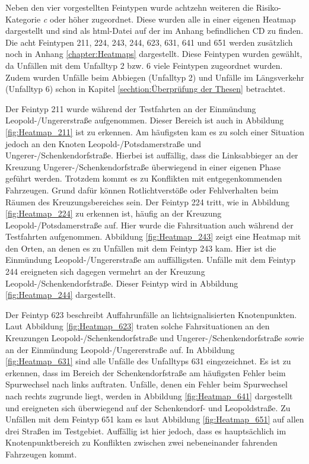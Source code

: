 Neben den vier vorgestellten Feintypen wurde achtzehn weiteren die Risiko-Kategorie \textit{c} oder höher zugeordnet. Diese wurden alle in einer eigenen Heatmap dargestellt und sind als html-Datei auf der im Anhang befindlichen CD zu finden. Die acht Feintypen 211, 224, 243, 244, 623, 631, 641 und 651 werden zusätzlich noch in Anhang \ref{chapter:Heatmaps} dargestellt. Diese Feintypen wurden gewählt, da Unfällen mit dem Unfalltyp 2 bzw. 6 viele Feintypen zugeordnet wurden. Zudem wurden Unfälle beim Abbiegen (Unfalltyp 2) und Unfälle im Längsverkehr (Unfalltyp 6) schon in Kapitel \ref{sechtion:Überprüfung der Thesen} betrachtet.

Der Feintyp 211 wurde während der Testfahrten an der Einmündung Leopold-/Ungererstraße aufgenommen. Dieser Bereich ist auch in Abbildung \ref{fig:Heatmap_211} ist zu erkennen. Am häufigsten kam es zu solch einer Situation jedoch an den Knoten Leopold-/Potsdamerstraße und Ungerer-/Schenkendorfstraße. Hierbei ist auffällig, dass die Linksabbieger an der Kreuzung Ungerer-/Schenkendorfstraße überwiegend in einer eigenen Phase geführt werden. Trotzdem kommt es zu Konflikten mit entgegenkommenden Fahrzeugen. Grund dafür können Rotlichtverstöße oder Fehlverhalten beim Räumen des Kreuzungsbereiches sein. Der Feintyp 224 tritt, wie in Abbildung \ref{fig:Heatmap_224} zu erkennen ist, häufig an der Kreuzung Leopold-/Potsdamerstraße auf. Hier wurde die Fahrsituation auch während der Testfahrten aufgenommen. Abbildung \ref{fig:Heatmap_243} zeigt eine Heatmap mit den Orten, an denen es zu Unfällen mit dem Feintyp 243 kam. Hier ist die Einmündung Leopold-/Ungererstraße am auffälligsten. Unfälle mit dem Feintyp 244 ereigneten sich dagegen vermehrt an der Kreuzung Leopold-/Schenkendorfstraße. Dieser Feintyp wird in Abbildung \ref{fig:Heatmap_244} dargestellt.

Der Feintyp 623 beschreibt Auffahrunfälle an lichtsignalisierten Knotenpunkten. Laut Abbildung \ref{fig:Heatmap_623} traten solche Fahrsituationen an den Kreuzungen Leopold-/Schenkendorfstraße und Ungerer-/Schenkendorfstraße sowie an der Einmündung Leopold-/Ungererstraße auf. In Abbildung \ref{fig:Heatmap_631} sind alle Unfälle des Unfalltyps 631 eingezeichnet. Es ist zu erkennen, dass im Bereich der Schenkendorfstraße am häufigsten Fehler beim Spurwechsel nach links auftraten. Unfälle, denen ein Fehler beim Spurwechsel nach rechts zugrunde liegt, werden in Abbildung \ref{fig:Heatmap_641} dargestellt und ereigneten sich überwiegend auf der Schenkendorf- und Leopoldstraße. Zu Unfällen mit dem Feintyp 651 kam es laut Abbildung \ref{fig:Heatmap_651} auf allen drei Straßen im Testgebiet. Auffällig ist hier jedoch, dass es hauptsächlich im Knotenpunktbereich zu Konflikten zwischen zwei nebeneinander fahrenden Fahrzeugen kommt.

